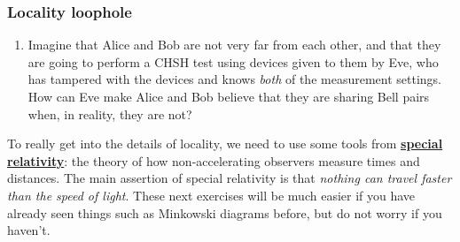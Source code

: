 \documentclass[fleqn,a4paper]{article}
\providecommand{\tightlist}{\setlength{\itemsep}{0pt}\setlength{\parskip}{0pt}}
\theoremstyle{definition}
\theoremstyle{definition}
\theoremstyle{definition}
\theoremstyle{definition}
\theoremstyle{remark}
\begin{document}
\hypertarget{locality-loophole}{%
\subsubsection{Locality loophole}\label{locality-loophole}}

\begin{enumerate}
\def\labelenumi{\arabic{enumi}.}
\tightlist
\item
  Imagine that Alice and Bob are not very far from each other, and that they are going to perform a CHSH test using devices given to them by Eve, who has tampered with the devices and knows \emph{both} of the measurement settings.
  How can Eve make Alice and Bob believe that they are sharing Bell pairs when, in reality, they are not?
\end{enumerate}

To really get into the details of locality, we need to use some tools from \href{https://en.wikipedia.org/wiki/Special_relativity}{\textbf{special relativity}}: the theory of how non-accelerating observers measure times and distances.
The main assertion of special relativity is that \emph{nothing can travel faster than the speed of light}.
These next exercises will be much easier if you have already seen things such as Minkowski diagrams before, but do not worry if you haven't.
\end{document}
